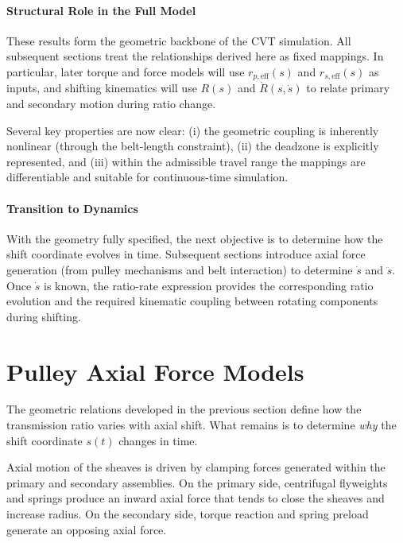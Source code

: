 \documentclass[11pt]{article}
\numberwithin{equation}{section}
\begin{document}
\paragraph{Structural Role in the Full Model}

These results form the geometric backbone of the CVT simulation. All subsequent sections treat
the relationships derived here as fixed mappings. In particular, later torque and force models
will use $r_{p,\text{eff}}(s)$ and $r_{s,\text{eff}}(s)$ as inputs, and shifting kinematics will
use $R(s)$ and $\dot R(s,\dot s)$ to relate primary and secondary motion during ratio change.

Several key properties are now clear:
(i) the geometric coupling is inherently nonlinear (through the belt-length constraint),
(ii) the deadzone is explicitly represented,
and (iii) within the admissible travel range the mappings are differentiable and suitable for
continuous-time simulation.

\paragraph{Transition to Dynamics}

With the geometry fully specified, the next objective is to determine how the shift coordinate
evolves in time. Subsequent sections introduce axial force generation (from pulley mechanisms and
belt interaction) to determine $\dot s$ and $\ddot s$. Once $\dot s$ is known, the ratio-rate
expression  provides the corresponding ratio evolution and the required
kinematic coupling between rotating components during shifting.


\section{Pulley Axial Force Models}\label{sec:axial}

The geometric relations developed in the previous section define how
the transmission ratio varies with axial shift. What remains is to
determine \emph{why} the shift coordinate $s(t)$ changes in time.

Axial motion of the sheaves is driven by clamping forces generated
within the primary and secondary assemblies. On the primary side,
centrifugal flyweights and springs produce an inward axial force
that tends to close the sheaves and increase radius. On the secondary
side, torque reaction and spring preload generate an opposing axial
force.
\end{document}
